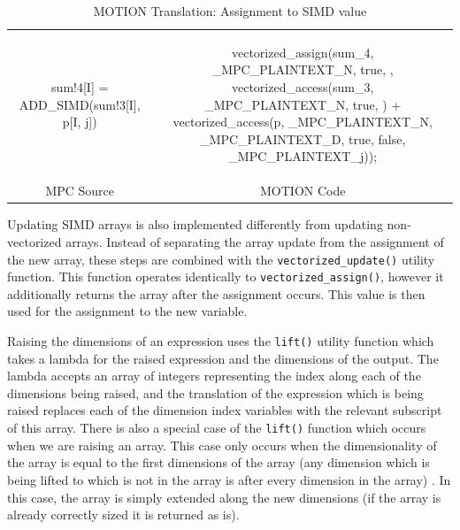\begin{table}
\begin{tabular}{cc}
\begin{minipage}{0.5\textwidth}
{\small
\begin{pythonn}
sum!4[I] = ADD_SIMD(sum!3[I], p[I, j])
\end{pythonn}
}
\end{minipage}

&

\begin{minipage}{0.5\textwidth}
{\small
\begin{cppp}
vectorized_assign(sum_4, {_MPC_PLAINTEXT_N}, {true}, {}, vectorized_access(sum_3, {_MPC_PLAINTEXT_N}, {true}, {}) + vectorized_access(p, {_MPC_PLAINTEXT_N, _MPC_PLAINTEXT_D}, {true, false}, {_MPC_PLAINTEXT_j}));
\end{cppp}
}
\end{minipage}

\\

MPC Source & MOTION Code
\end{tabular}
\caption{MOTION Translation: Assignment to SIMD value}
\label{tab:motion_translation_simd_assignment}
\end{table}

Updating SIMD arrays is also implemented differently from updating non-vectorized arrays.  Instead of separating the array update from the assignment of the new array, these steps are combined with the \texttt{vectorized\_update()} utility function.  This function operates identically to \texttt{vectorized\_assign()}, however it additionally returns the array after the assignment occurs.  This value is then used for the assignment to the new variable.

Raising the dimensions of an expression uses the \texttt{lift()} utility function which takes a lambda for the raised expression and the dimensions of the output.  The lambda accepts an array of integers representing the index along each of the dimensions being raised, and the translation of the expression which is being raised replaces each of the dimension index variables with the relevant subscript of this array.  There is also a special case of the \texttt{lift()} function which occurs when we are raising an array.  This case only occurs when the dimensionality of the array is equal to the first dimensions of the array (any dimension which is being lifted to which is not in the array is after every dimension in the array) .  In this case, the array is simply extended along the new dimensions (if the array is already correctly sized it is returned as is).

